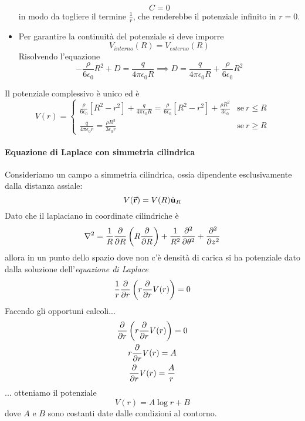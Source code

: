 \begin{examplewt}
\begin{itemize}
		\begin{equation*}
			C=0
		\end{equation*}
		in modo da togliere il termine $\frac{1}{r}$, che renderebbe il potenziale infinito in $r=0$.
		\item Per garantire la continuità del potenziale si deve imporre
		\begin{equation*}
			V_{interno}(R)=V_{esterno}(R)
		\end{equation*}
			Risolvendo l'equazione
		\begin{equation*}
			-\frac{\rho}{6\epsilon_0}R^2+D=\frac{q}{4\pi\epsilon_0R}\implies D=\frac{q}{4\pi\epsilon_0R}+\frac{\rho}{6\epsilon_0}R^2
		\end{equation*}
	\end{itemize}
Il potenziale complessivo è unico ed è
\begin{equation}
	V(r)=
	\begin{cases}
		\frac{\rho}{6\epsilon_0}\left[R^2-r^2\right]+\frac{q}{4\pi\epsilon_0R}=\frac{\rho}{6\epsilon_0}\left[R^2-r^2\right]+\frac{\rho R^2}{3\epsilon_0}&\text{se}\ r\leq R\\
		\frac{q}{4\pi\epsilon_0r}=\frac{\rho R^3}{3\epsilon_0r}&\text{se}\ r\geq R
	\end{cases}
\end{equation}
\end{examplewt}
\paragraph{Equazione di Laplace con simmetria cilindrica}
Consideriamo un campo a simmetria cilindrica, ossia dipendente esclusivamente dalla distanza assiale:
\begin{equation*}
	V(\vb*{\va{r}})=V(R)\hat{\mathbf{u}}_R
\end{equation*}
Dato che il laplaciano in coordinate cilindriche è
\begin{equation*}
	\laplacian=\frac{1}{R}\pdv{R}\left(R\pdv{R}\right)+\frac{1}{R^2}\pdv[2]{\theta}+\pdv[2]{z}
\end{equation*}
allora in un punto dello spazio dove non c'è densità di carica si ha potenziale dato dalla soluzione dell'\textit{equazione di Laplace}
\begin{equation*}
	\frac{1}{r}\pdv{r}\left(r\pdv{r}V(r)\right)=0
\end{equation*}
Facendo gli opportuni calcoli...
\begin{gather*}
	\pdv{r}\left(r\pdv{r}V(r)\right)=0\\
	r\pdv{r}V(r)=A\\
	\pdv{r}V(r)=\frac{A}{r}\\
\end{gather*}
... otteniamo il potenziale
\begin{equation}
	V(r)=A\log{r}+B
\end{equation}
dove $A$ e $B$ sono costanti date dalle condizioni al contorno.


